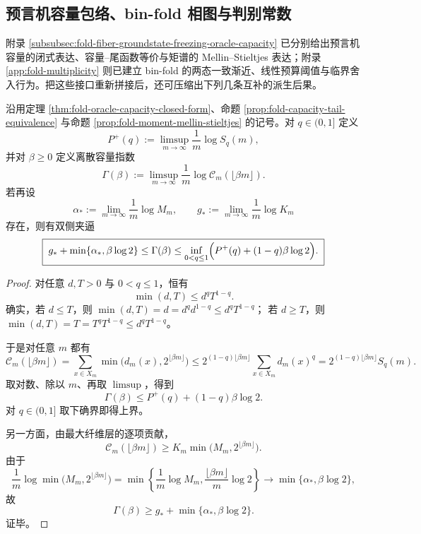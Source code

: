 \subsection{预言机容量包络、bin-fold 相图与判别常数}

附录 \ref{subsubsec:fold-fiber-groundstate-freezing-oracle-capacity} 已分别给出预言机容量的闭式表达、容量--尾函数等价与矩谱的 Mellin--Stieltjes 表达；附录 \ref{app:fold-multiplicity} 则已建立 bin-fold 的两态一致渐近、线性预算阈值与临界舍入行为。把这些接口重新拼接后，还可压缩出下列几条互补的派生后果。

\begin{theorem}[预言机容量指数的矩谱上包络与冻结下支]\label{thm:derived-oracle-capacity-moment-envelope}
沿用定理 \ref{thm:fold-oracle-capacity-closed-form}、命题 \ref{prop:fold-capacity-tail-equivalence} 与命题 \ref{prop:fold-moment-mellin-stieltjes} 的记号。对 \(q\in(0,1]\) 定义
\[
P^{+}(q):=\limsup_{m\to\infty}\frac1m\log S_q(m),
\]
并对 \(\beta\ge 0\) 定义离散容量指数
\[
\Gamma(\beta):=\limsup_{m\to\infty}\frac1m\log \mathcal C_m(\lfloor \beta m\rfloor).
\]
若再设
\[
\alpha_*:=\lim_{m\to\infty}\frac1m\log M_m,
\qquad
g_*:=\lim_{m\to\infty}\frac1m\log K_m
\]
存在，则有双侧夹逼
\[
\boxed{\;
g_*+\min\{\alpha_*,\beta\log 2\}
\le
\Gamma(\beta)
\le
\inf_{0<q\le 1}\Bigl(P^{+}(q)+(1-q)\beta\log 2\Bigr).\;}
\]
\end{theorem}
\begin{proof}
对任意 \(d,T>0\) 与 \(0<q\le 1\)，恒有
\[
\min(d,T)\le d^qT^{1-q}.
\]
确实，若 \(d\le T\)，则
\(
\min(d,T)=d=d^qd^{1-q}\le d^qT^{1-q}
\)；
若 \(d\ge T\)，则
\(
\min(d,T)=T=T^qT^{1-q}\le d^qT^{1-q}
\)。

于是对任意 \(m\) 都有
\[
\mathcal C_m(\lfloor \beta m\rfloor)
=
\sum_{x\in X_m}\min\bigl(d_m(x),2^{\lfloor \beta m\rfloor}\bigr)
\le
2^{(1-q)\lfloor \beta m\rfloor}\sum_{x\in X_m}d_m(x)^q
=
2^{(1-q)\lfloor \beta m\rfloor}S_q(m).
\]
取对数、除以 \(m\)、再取 \(\limsup\)，得到
\[
\Gamma(\beta)\le P^{+}(q)+(1-q)\beta\log 2.
\]
对 \(q\in(0,1]\) 取下确界即得上界。

另一方面，由最大纤维层的逐项贡献，
\[
\mathcal C_m(\lfloor \beta m\rfloor)\ge K_m\min\bigl(M_m,2^{\lfloor \beta m\rfloor}\bigr).
\]
由于
\[
\frac1m\log \min\bigl(M_m,2^{\lfloor \beta m\rfloor}\bigr)
=
\min\!\left\{\frac1m\log M_m,\frac{\lfloor \beta m\rfloor}{m}\log 2\right\}
\longrightarrow
\min\{\alpha_*,\beta\log 2\},
\]
故
\[
\Gamma(\beta)\ge g_*+\min\{\alpha_*,\beta\log 2\}.
\]
证毕。
\end{proof}

